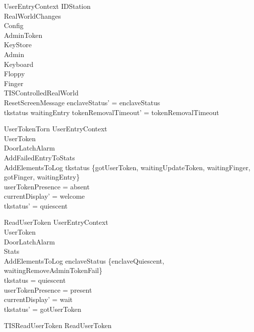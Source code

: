\begin{schema}{UserEntryContext}
  \Delta IDStation\\
  RealWorldChanges\\
  \Xi Config\\
  \Xi AdminToken\\
  \Xi KeyStore\\
  \Xi Admin\\
  \Xi Keyboard\\
  \Xi Floppy\\
  \Xi Finger\\
  \Xi TISControlledRealWorld\\
  ResetScreenMessage
\where
  enclaveStatus' = enclaveStatus\\
  tkstatus \neq  waitingEntry \implies  tokenRemovalTimeout' = tokenRemovalTimeout
\end{schema}

\begin{schema}{UserTokenTorn}
  UserEntryContext\\
  \Xi UserToken\\
  \Xi DoorLatchAlarm\\
  AddFailedEntryToStats\\
  AddElementsToLog
\where
  tkstatus \in  \{gotUserToken, waitingUpdateToken, waitingFinger, gotFinger, waitingEntry\}\\
  userTokenPresence = absent\\
  currentDisplay' = welcome\\
  tkstatus' = quiescent
\end{schema}

\begin{schema}{ReadUserToken}
  UserEntryContext\\
  \Xi UserToken\\
  \Xi DoorLatchAlarm\\
  \Xi Stats\\
  AddElementsToLog
\where
  enclaveStatus \in  \{enclaveQuiescent, waitingRemoveAdminTokenFail\}\\
  tkstatus = quiescent\\
  userTokenPresence = present\\
  currentDisplay' = wait\\
  tkstatus' = gotUserToken
\end{schema}

\begin{zed}
TISReadUserToken  ReadUserToken
\end{zed}


